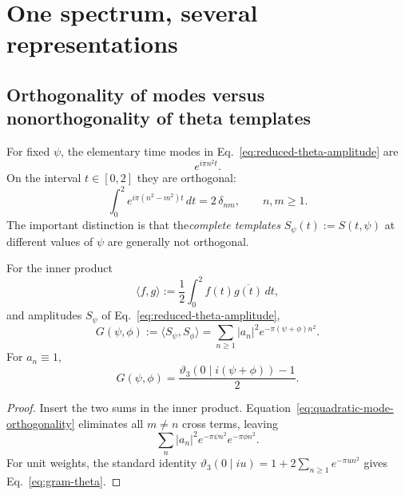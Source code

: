 \section{One spectrum, several representations}

\subsection{Orthogonality of modes versus nonorthogonality of theta templates}

For fixed $\psi$, the elementary time modes in Eq.~\eqref{eq:reduced-theta-amplitude} are
\begin{equation}
  e^{i\pi n^2 t}.
\end{equation}
On the interval $t\in[0,2]$ they are orthogonal:
\begin{equation}
 \int_0^2 e^{i\pi(n^2-m^2)t}\,dt
 = 2\,\delta_{nm},
 \qquad n,m\ge1.
 \label{eq:quadratic-mode-orthogonality}
\end{equation}
The important distinction is that the\emph{complete templates}
$S_\psi(t):=S(t,\psi)$ at different values of $\psi$ are generally not orthogonal.

\begin{theorem}
For the inner product
\begin{equation}
  \langle f,g\rangle:=\frac12\int_0^2 f(t)\overline{g(t)}\,dt,
\end{equation}
and amplitudes $S_\psi$ of Eq.~\eqref{eq:reduced-theta-amplitude},
\begin{equation}
  G(\psi,\phi)
  :=\langle S_\psi,S_\phi\rangle
  =\sum_{n\ge1}|a_n|^2e^{-\pi(\psi+\phi)n^2}.
  \label{eq:gram-general}
\end{equation}
For $a_n\equiv1$,
\begin{equation}
  G(\psi,\phi)
  =\frac{\vartheta_3(0\mid i(\psi+\phi))-1}{2}.
  \label{eq:gram-theta}
\end{equation}
\end{theorem}

\begin{proof}
Insert the two sums in the inner product.  Equation~\eqref{eq:quadratic-mode-orthogonality}
eliminates all $m\neq n$ cross terms, leaving
\[
  \sum_n |a_n|^2 e^{-\pi\psi n^2}e^{-\pi\phi n^2}.
\]
For unit weights, the standard identity
$\vartheta_3(0\mid iu)=1+2\sum_{n\ge1}e^{-\pi u n^2}$ gives
Eq.~\eqref{eq:gram-theta}.
\end{proof}

